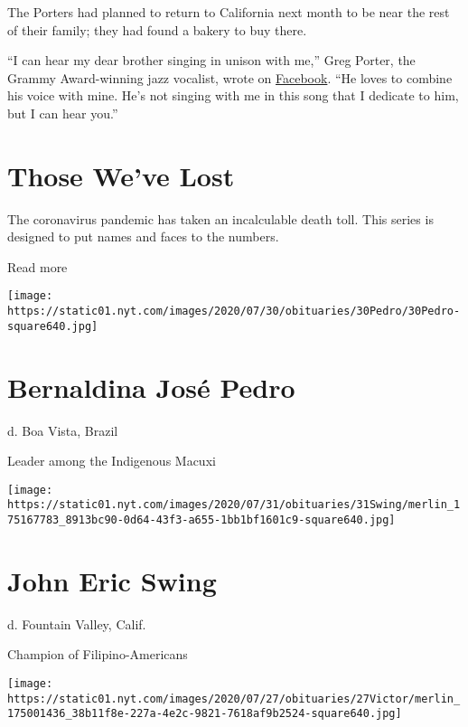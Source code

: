 The Porters had planned to return to California next month to be near
the rest of their family; they had found a bakery to buy there.

``I can hear my dear brother singing in unison with me,'' Greg Porter,
the Grammy Award-winning jazz vocalist, wrote on
\href{https://www.facebook.com/gregoryportermusic/posts/3090807907636078}{Facebook}.
``He loves to combine his voice with mine. He's not singing with me in
this song that I dedicate to him, but I can hear you.''

\href{https://www.nytimes.com/interactive/2020/obituaries/people-died-coronavirus-obituaries.html?action=click\&pgtype=Article\&state=default\&region=BELOW_MAIN_CONTENT\&context=covid_obits_promo}{}

\hypertarget{those-weve-lost}{%
\section{Those We've Lost}\label{those-weve-lost}}

The coronavirus pandemic has taken an incalculable death toll. This
series is designed to put names and faces to the numbers.

Read more

\texttt{[image: https://static01.nyt.com/images/2020/07/30/obituaries/30Pedro/30Pedro-square640.jpg]}

\hypertarget{bernaldina-josuxe9-pedro}{%
\section{Bernaldina José Pedro}\label{bernaldina-josuxe9-pedro}}

d. Boa Vista, Brazil

Leader among the Indigenous Macuxi

\texttt{[image: https://static01.nyt.com/images/2020/07/31/obituaries/31Swing/merlin\_175167783\_8913bc90-0d64-43f3-a655-1bb1bf1601c9-square640.jpg]}

\hypertarget{john-eric-swing}{%
\section{John Eric Swing}\label{john-eric-swing}}

d. Fountain Valley, Calif.

Champion of Filipino-Americans

\texttt{[image: https://static01.nyt.com/images/2020/07/27/obituaries/27Victor/merlin\_175001436\_38b11f8e-227a-4e2c-9821-7618af9b2524-square640.jpg]}

